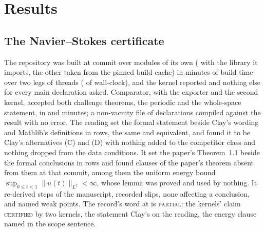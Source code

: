 \documentclass[preprint,11pt,authoryear,a4paper]{elsarticle}
\newcommand{\vword}[1]{{\normalfont\scshape #1}}
\newcommand{\vC}{\vword{certified}}
\newcommand{\vP}{\vword{partial}}
\begin{document}
\section{Results}\label{sec:results}

\subsection{The Navier--Stokes certificate}\label{sec:ns}
The repository was built at commit \NsCommit{} over \MtNsJobsBuilt{} modules of its own (\MtNsJobsTotal{} with the library it imports, the other \MtNsNotRebuilt{} taken from the pinned build cache) in \MtNsBuildMinutes{} minutes of build time over two legs of \MtNsBuildLegs{} threads (\MtNsBuildWall{} of wall-clock), and the kernel reported \AxiomList{} and nothing else for every main declaration asked. Comparator, with the exporter and the second kernel, accepted both challenge theorems, the periodic and the whole-space statement, in \ComparatorMinutesNS{} and \ComparatorMinutesEuler{} minutes; a non-vacuity file of \MtNsNonVacuity{} declarations compiled against the result with no error. The reading set the formal statement beside Clay's wording \citep{Fefferman00} and Mathlib's definitions in \FidelityRows{} rows, \FidelitySame{} the same and \FidelityEquivalent{} equivalent, and found it to be Clay's alternatives (C) and (D) with nothing added to the competitor class and nothing dropped from the data conditions. It set the paper's Theorem~1.1 beside the formal conclusions in \PaperVsLeanRows{} rows and found \PaperClausesNotFormal{} clauses of the paper's theorem absent from them at that commit, among them the uniform energy bound $\sup_{0 \le t < 1}\|u(t)\|_{L^2} < \infty$, whose lemma was proved and used by nothing. It re-derived \MtNsByHand{} steps of the manuscript, recorded \MtNsSlips{} slips, none affecting a conclusion, and named \MtNsWeakPoints{} weak points. The record's word at \NsCommit{} is \vP: the kernels' claim \vC{} by two kernels, the statement Clay's on the reading, the energy clause named in the scope sentence.
\end{document}
